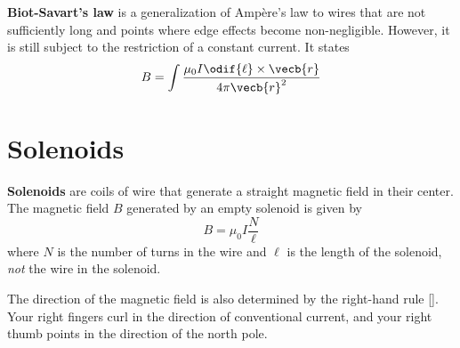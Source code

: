 \textbf{Biot-Savart's law} is a generalization of Ampère's law
to wires that are not sufficiently long
and points where edge effects become non-negligible.
However, it is still subject to the restriction of a constant current.
It states
\begin{equation}
    B = \int \frac{\mu_0 I \odif{\ell} \times \vecb{r}}{4 \pi \vecb{r}^2}
\end{equation}

\section{Solenoids}

\textbf{Solenoids} are coils of wire that generate a straight magnetic field
in their center.
The magnetic field \(B\) generated by an empty solenoid is given by
\begin{equation}
    B = \mu_0 I \frac{N}{\ell}
\end{equation}
where \(N\) is the number of turns in the wire
and \(\ell\) is the length of the solenoid,
\emph{not} the wire in the solenoid.

The direction of the magnetic field is also determined
by the right-hand rule [].
Your right fingers curl in the direction of conventional current,
and your right thumb points in the direction of the north pole.
